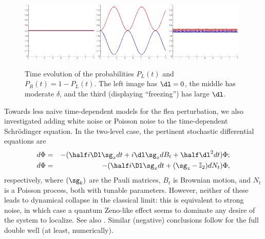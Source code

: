 \documentclass[12pt]{article}
\def\red#1{\textcolor{slidered}{#1}}
\def\blue#1{\textcolor{slideblue}{#1}}
\begin{document}
\begin{figure}
\begin{center}
\includegraphics[width=0.32\textwidth]{GeenStoring.png}
\includegraphics[width=0.32\textwidth]{KleineStoring.png}
\includegraphics[width=0.32\textwidth]{GroteStoring.png}
\caption{Time evolution of the probabilities \blue{$P_L(t)$} and \red{$P_R(t)=1-P_L(t)$}.
The left image has $\dl=0$,  the middle has moderate $\delta$,  and the third  (displaying ``freezing'') has large $\dl$.}
\label{TLSConstant}
\end{center}
\end{figure}
Towards less naive time-dependent models for the flea perturbation, we also investigated adding white noise or Poisson noise to the  time-dependent  Schr\"{o}dinger equation. In the two-level case, the pertinent
stochastic differential equations are
\begin{eqnarray}
d\Phi&=& -(\half i\Dl \sg_x dt+i\dl\sg_z dB_t+\half\dl^2 dt)\Phi;\\
d\Phi&=&-(\half i\Dl \sg_x dt+ (\sg_z-\mathbb{I}_2)dN_t)\Phi,
\end{eqnarray}
respectively, where $(\sg_k)$ are the Pauli matrices, $B_t$ is Brownian motion, and $N_t$ is a Poisson process, both with tunable parameters. 
However, neither of these leads to dynamical collapse in the classical limit: this is equivalent to strong noise, in which case  a quantum Zeno-like effect seems to dominate any desire of the system to localize.
See also  \cite{Berry, Blanchard1, MS2}.
Similar (negative) conclusions follow for the full double well (at least, numerically).
\medskip
\end{document}
